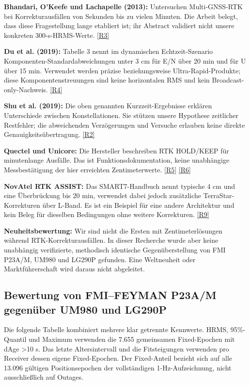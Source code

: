 \documentclass[11pt,a4paper]{article}
\numberwithin{equation}{section}
\numberwithin{figure}{section}
\begin{document}
\textbf{Bhandari, O’Keefe und Lachapelle (2013):} Untersuchen Multi-GNSS-RTK bei Korrekturausfällen von Sekunden bis zu vielen Minuten. Die Arbeit belegt, dass diese Fragestellung lange etabliert ist; ihr Abstract validiert nicht unsere konkreten 300-s-HRMS-Werte. \hyperlink{ref-R3}{[R3]}

\textbf{Du et al. (2019):} Tabelle 3 nennt im dynamischen Echtzeit-Szenario Komponenten-Standardabweichungen unter 3 cm für E/\allowbreak{}N über 20 min und für U über 15 min. Verwendet werden präzise beziehungsweise Ultra-Rapid-Produkte; diese Komponentenstreuungen sind keine horizontalen RMS und kein Broadcast-only-Nachweis. \hyperlink{ref-R4}{[R4]}

\textbf{Shu et al. (2019):} Die oben genannten Kurzzeit-Ergebnisse erklären Unterschiede zwischen Konstellationen. Sie stützen unsere Hypothese zeitlicher Restfehler; die abweichenden Verzögerungen und Versuche erlauben keine direkte Genauigkeitsübertragung. \hyperlink{ref-R2}{[R2]}

\textbf{Quectel und Unicore:} Die Hersteller beschreiben RTK HOLD/\allowbreak{}KEEP für minutenlange Ausfälle. Das ist Funktionsdokumentation, keine unabhängige Messbestätigung der hier erreichten Zentimeterwerte. \hyperlink{ref-R5}{[R5]} \hyperlink{ref-R6}{[R6]}

\textbf{NovAtel RTK ASSIST:} Das SMART7-Handbuch nennt typische 4 cm und eine Überbrückung bis 20 min, verwendet dabei jedoch zusätzliche TerraStar-Korrekturen über L-Band. Es ist ein Beispiel für eine andere Architektur und kein Beleg für dieselben Bedingungen ohne weitere Korrekturen. \hyperlink{ref-R9}{[R9]}

\textbf{Neuheitsbewertung:} Wir sind nicht die Ersten mit Zentimeterlösungen während RTK-Korrekturausfällen. In dieser Recherche wurde aber keine unabhängig verifizierte, methodisch identische Gegenüberstellung von FMI P23A/\allowbreak{}M, UM980 und LG290P gefunden. Eine Weltneuheit oder Marktführerschaft wird daraus nicht abgeleitet.

\subsection{Bewertung von FMI–FEYMAN P23A/\allowbreak{}M gegenüber UM980 und LG290P}

Die folgende Tabelle kombiniert mehrere klar getrennte Kennwerte. HRMS, 95\%-Quantil und Maximum verwenden die 7.655 gemeinsamen Fixed-Epochen mit dAge >10 s. Das letzte Altersintervall und die Fitsteigungen verwenden pro Receiver dessen eigene Fixed-Epochen. Der Fixed-Anteil bezieht sich auf alle 13.096 gültigen Positionsepochen der vollständigen 1-Hz-Aufzeichnung, nicht ausschließlich auf Outages.
\end{document}
